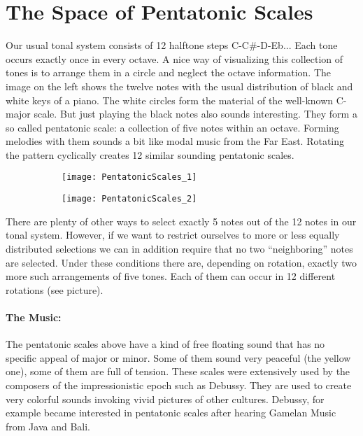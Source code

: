 \section{The Space of Pentatonic Scales}
Our usual tonal system consists of 12 halftone steps C-C\#-D-Eb... Each tone occurs exactly once in every octave. A nice way of visualizing this collection of tones is to arrange them in a circle and neglect the octave information. The image on the left shows the twelve notes with the usual distribution of black and white keys of a piano. The white circles form the material of the well-known C-major scale. But just playing the black notes also sounds interesting. They form a so called pentatonic scale: a collection of five notes within an octave. Forming melodies with them sounds a bit like modal music from the Far East. Rotating the pattern cyclically creates 12 similar sounding pentatonic scales.

\begin{figure}[h]
\centering
\begin{subfigure}{0.45\textwidth}
\centering
\texttt{[image: PentatonicScales\_1]}
\end{subfigure}
\begin{subfigure}{0.45\textwidth}
\centering
\texttt{[image: PentatonicScales\_2]}
\end{subfigure}
\end{figure}

There are plenty of other ways to select exactly 5 notes out of the 12 notes in our tonal system. However, if we want to restrict ourselves to more or less equally distributed selections we can in addition require that no two ``neighboring'' notes are selected. Under these conditions there are, depending on rotation, exactly two more such arrangements of five tones. Each of them can occur in 12 different rotations (see picture).

\paragraph{The Music:} The pentatonic scales above have a kind of free floating sound that has no specific appeal of major or minor. Some of them sound very peaceful (the yellow one), some of them are full of tension. These scales were extensively used by the composers of the impressionistic epoch such as Debussy. They are used to create very colorful sounds invoking vivid pictures of other cultures. Debussy, for example became interested in pentatonic scales after hearing Gamelan Music from Java and Bali.


